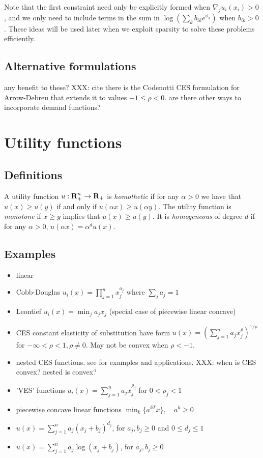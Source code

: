 \documentclass{article}
\begin{document}
Note that the first constraint need only be explicitly formed when $\nabla_j u_i(x_i) > 0$, and we only need to include terms in the sum in
$\log(\sum_k b_{ik} e^{\phi_k})$ when $b_{ik} > 0$. These ideas will be used later when we exploit sparsity to solve these problems efficiently.

\subsection{Alternative formulations}
any benefit to these? XXX: cite
there is the Codenotti CES formulation for Arrow-Debreu that extends it to values $-1 \leq \rho < 0$. are there other ways to incorporate demand functions?

\section{Utility functions}
\subsection{Definitions}
A utility function $u: {\mbox{\bf R}}^n_+ \to {\mbox{\bf R}}_+$ is \emph{homothetic} if for any $\alpha > 0$ we have that $u(x) \geq u(y)$ if and only if
$u(\alpha x) \geq u(\alpha y)$.
The utility function is \emph{monotone} if $x \geq y$ implies that $u(x) \geq u(y)$.
It is \emph{homogeneous} of degree $d$ if for any $\alpha > 0$,
$u(\alpha x) = \alpha^d u(x)$.

\subsection{Examples}
\begin{itemize}
\item linear
\item Cobb-Douglas $u_i(x) = \prod_{j=1}^{n} x_j^{a_j}$ where $\sum_j a_j = 1$
\item Leontief $u_i(x) = \min_j a_j x_j$ (special case of piecewise linear concave)
\item CES constant elasticity of substitution have form
$u(x) = \left(\sum_{j=1}^n a_j x_j^\rho \right)^{1/\rho}$ for $-\infty < \rho <1, \rho \neq 0$. May not be convex when $\rho < -1$.
\item nested CES functions. see \cite{shoven1992applying} for examples and applications. XXX: when is CES convex? nested is convex?
\item 'VES' functions  $u_i(x) = \sum_{j=1}^{n} a_j x_j^{\rho_j}$ for $0 < \rho_j < 1$
\item piecewise concave linear functions $\min_k\lbrace a^{kT}x \rbrace,\quad a^k \geq 0$
\item $u(x) = \sum_{j=1}^n a_j (x_j+ b_j)^{d_j}$, for $a_j, b_j \geq 0$ and $0 \leq d_j \leq 1$
\item $u(x) = \sum_{j=1}^n a_j \log(x_j+ b_j)$, for $a_j, b_j \geq 0$
\end{itemize}
\end{document}
